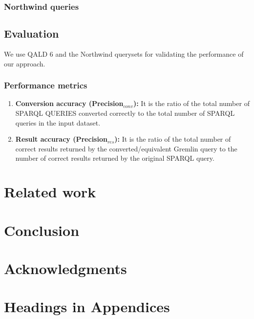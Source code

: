 \documentclass{sig-alternate-05-2015}
\begin{document}
\subsubsection{Northwind queries}
\subsection{Evaluation}
We use QALD 6 and the Northwind querysets for validating the performance of our approach.
\subsubsection{Performance metrics}
\begin{enumerate}
    \item \textbf{Conversion accuracy (Precision$_{conv}$):} It is the ratio of the total number of SPARQL QUERIES converted correctly to the total number of SPARQL queries in the input dataset.
    \item \textbf{Result accuracy (Precision$_{res}$):} It is the ratio of the total number of correct results returned by the converted/equivalent Gremlin query to the number of correct results returned by the original SPARQL query.
\end{enumerate}

\section{Related work}

\section{Conclusion}

\section{Acknowledgments}



\appendix

\section{Headings in Appendices}
\end{document}
